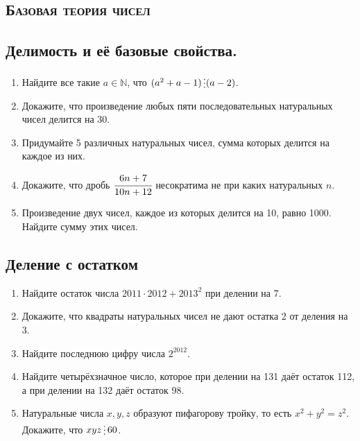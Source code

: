 \documentclass[11pt]{article}
\begin{document}
\begin{center}
\section*{\textsc{Базовая теория чисел}}
\end{center}
    \subsection*{Делимость и её базовые свойства.}
    \begin{enumerate}[start=1,label={\bfseries \arabic*.}]
        \item Найдите все такие $a \in \mathbb{N}$, что $(a^2 + a - 1) \divisible (a - 2)$.

        \item Докажите, что произведение любых пяти последовательных натуральных чисел делится на 30.

        \item Придумайте 5 различных натуральных чисел, сумма которых делится на каждое из них.

        \item Докажите, что дробь $\cfrac{6n + 7}{10n + 12}$ несократима не при каких натуральных $n$.

        \item Произведение двух чисел, каждое из которых делится на 10, равно 1000. Найдите сумму этих чисел.

    \end{enumerate}
    \subsection*{Деление с остатком}
    \begin{enumerate}[start=6,label={\bfseries \arabic*.}]
        \item Найдите остаток числа $2011 \cdot 2012 + 2013^2$ при делении на 7.

        \item Докажите, что квадраты натуральных чисел не дают остатка 2 от деления на 3.

        \item Найдите последнюю цифру числа $2^2012$.

        \item Найдите четырёхзначное число, которое при делении на 131 даёт остаток 112, а при делении на 132 даёт остаток 98.

        \item  Натуральные числа $x, y, z$ образуют пифагорову тройку, то есть $x^2 + y^2 = z^2$. Докажите, что $x y z \divisible 60$.
    \end{enumerate}
\end{document}
